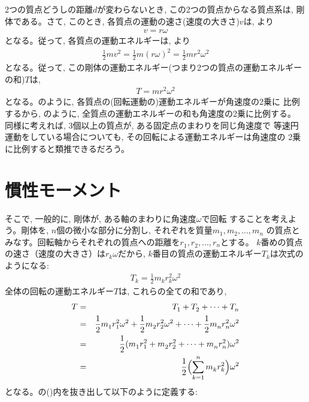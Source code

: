 2つの質点どうしの距離$d$が変わらないとき, この2つの質点からなる質点系は, 
剛体である。さて, このとき, 各質点の運動の速さ(速度の大きさ)$v$は, より
\begin{eqnarray}
v=r\omega
\end{eqnarray}
となる。従って, 各質点の運動エネルギーは, より
\begin{eqnarray}
\frac{1}{2}mv^2=\frac{1}{2}m(r\omega)^2=\frac{1}{2}mr^2\omega^2\label{eq:rot_kineticE}
\end{eqnarray}
となる。従って, この剛体の運動エネルギー(つまり2つの質点の運動エネルギーの和)$T$は, 
\begin{eqnarray}
T=mr^2\omega^2\label{eq:rot_kineticE2}
\end{eqnarray}
となる。のように, 各質点の(回転運動の)運動エネルギーが角速度の2乗に
比例するから, のように, 全質点の運動エネルギーの和も角速度の2乗に比例する。
同様に考えれば, 3個以上の質点が, ある固定点のまわりを同じ角速度で
等速円運動をしている場合についても, その回転による運動エネルギーは角速度の
2乗に比例すると類推できるだろう。\hv


\section{慣性モーメント}

そこで, 一般的に, 剛体が, ある軸のまわりに角速度$\omega$で回転
することを考えよう。剛体を, $n$個の微小な部分に分割し, それぞれを質量$m_1^{\,}, m_2^{\,}, ..., m_n^{\,}$
の質点とみなす。回転軸からそれぞれの質点への距離を$r_1^{\,}, r_2^{\,}, ..., r_n^{\,}$とする。
$k$番めの質点の速さ（速度の大きさ）は$r_k\omega$だから, 
$k$番目の質点の運動エネルギー$T_k^{\,}$は次式のようになる: 
\begin{eqnarray}
T_k=\frac{1}{2}m_k^{\,}r_k^2\omega^2
\end{eqnarray}
全体の回転の運動エネルギー$T$は, これらの全ての和であり, 
\begin{eqnarray}
T&=&T_1^{\,}+T_2^{\,}+\cdots+T_n^{\,}\nonumber\\
 &=&\frac{1}{2}m_1^{\,}r_1^2\omega^2+\frac{1}{2}m_2^{\,}r_2^2\omega^2+\cdots+\frac{1}{2}m_n^{\,}r_n^2\omega^2\nonumber\\
 &=&\frac{1}{2}(m_1^{\,}r_1^2+m_2^{\,}r_2^2+\cdots+m_n^{\,}r_n^2)\omega^2\nonumber\\
 &=&\frac{1}{2}\Bigl(\sum_{k=1}^{n}m_k^{\,}r_k^2\Bigr)\omega^2\label{eq:mominert00}
\end{eqnarray}
となる。の()内を抜き出して以下のように定義する:

